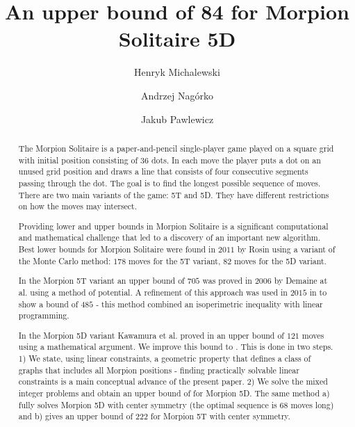 \documentclass[a4paper,UKenglish]{lipics}
\title{{An upper bound of 84 for Morpion Solitaire 5D}}%
\author[1]{Henryk Michalewski}
\author[1]{Andrzej Nagórko}
\author[1]{Jakub Pawlewicz}
\affil[1]{Department of Mathematics, Informatics and Mechanics\\ University of Warsaw\\ \{H.Michalewski,A.Nagorko,J.Pawlewicz\}@mimuw.edu.pl} %
\begin{document}
\maketitle

\begin{abstract} 
The Morpion Solitaire is a paper-and-pencil single-player game played on a square grid with initial position consisting of $36$ dots.
In each move the player puts a dot on an unused grid position and draws a line that 
  consists of four consecutive segments passing through the dot.
 The goal is to find the longest possible sequence of moves.
There are two main variants of the game: 5T and 5D. 
They have different restrictions on how the moves may intersect.

Providing lower and upper bounds in Morpion Solitaire is a significant computational and mathematical challenge
  that led to a discovery of an important new algorithm.
 Best lower bounds for Morpion Solitaire were found in $2011$ by Rosin \cite{rosin} using a variant of the Monte Carlo method: 
 $178$ moves for the 5T variant, $82$ moves for the 5D variant.
 
 In the Morpion 5T variant an upper bound of $705$ was proved in $2006$ by Demaine at al. \cite{demaine}  using a method of potential. 
A refinement of this approach was used in $2015$  in \cite{ijcai} to show a bound of $485$ - this method combined an isoperimetric inequality with linear programming. 

In the Morpion 5D variant 
Kawamura et al. proved in \cite{japonczycy} an upper bound of $121$ moves using a mathematical argument. 
We improve this bound to \therecord. 
This is done in two steps.
1) We state, using linear constraints, a geometric property that defines a class of graphs that includes all Morpion  positions - finding practically solvable linear constraints is a main conceptual advance of the present paper.
2) We solve the mixed integer problems and obtain 
an upper bound of \therecord for Morpion 5D. The same method a) fully solves Morpion 5D with center symmetry (the optimal sequence is $68$ moves long) and b) gives an upper bound of $222$ for Morpion 5T with center symmetry. 
\end{abstract}


  



  






\printbibliography 

\appendix


    
\end{document}
